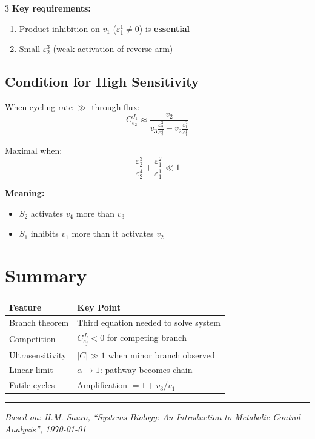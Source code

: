 \documentclass[10pt,landscape,letter]{article}
\begin{document}
\begin{multicols}{3}
\textbf{Key requirements:}
\begin{enumerate}
\item Product inhibition on $v_1$ ($\varepsilon^1_1 \neq 0$) is \textbf{essential}
\item Small $\varepsilon^3_2$ (weak activation of reverse arm)
\end{enumerate}

\subsection{Condition for High Sensitivity}

When cycling rate $\gg$ through flux:
\[
C^{J_1}_{e_2} \approx \frac{v_2}{v_3 \frac{\varepsilon^3_2}{\varepsilon^4_2} - v_2 \frac{\varepsilon^2_1}{\varepsilon^1_1}}
\]

Maximal when:
\[
\frac{\varepsilon^3_2}{\varepsilon^4_2} + \frac{\varepsilon^2_1}{\varepsilon^1_1} \ll 1
\]

\textbf{Meaning:}
\begin{itemize}
\item $S_2$ activates $v_4$ more than $v_3$
\item $S_1$ inhibits $v_1$ more than it activates $v_2$
\end{itemize}

\section{Summary}

\begin{center}
\small
\begin{tabular}{@{}p{2.2cm}p{4.5cm}@{}}
\toprule
\textbf{Feature} & \textbf{Key Point} \\
\midrule
Branch theorem & Third equation needed to solve system \\[4pt]
Competition & $C^{J_i}_{e_j} < 0$ for competing branch \\[4pt]
Ultrasensitivity & $|C| \gg 1$ when minor branch observed \\[4pt]
Linear limit & $\alpha \to 1$: pathway becomes chain \\[4pt]
Futile cycles & Amplification $= 1 + v_3/v_1$ \\
\bottomrule
\end{tabular}
\end{center}

\vfill
\hrule
\vspace{3pt}
\footnotesize
\textit{Based on: H.M. Sauro, ``Systems Biology: An Introduction to Metabolic Control Analysis'', \today}

\end{multicols}
\end{document}
